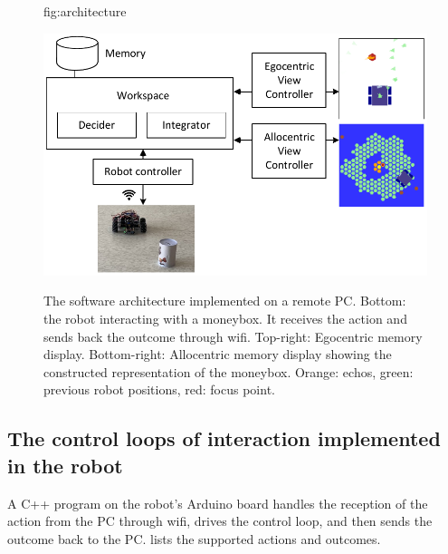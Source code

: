 \documentclass[pmlr]{jmlr}%
\begin{document}
\begin{figure}[htbp]
	\floatconts
	{fig:architecture}
	{\caption{The software architecture implemented on a remote PC. 
			Bottom: the robot interacting with a moneybox. 
			It receives the action and sends back the outcome through wifi.
			Top-right: Egocentric memory display.
			Bottom-right: Allocentric memory display showing the constructed representation of the moneybox.
			Orange: echos, green: previous robot positions, red: focus point.}}
	{\includegraphics[width=0.8\linewidth]{images/Figure_2_Architecture}}
\end{figure}


\subsection{The control loops of interaction implemented in the robot}
\label{moves}

A C++ program on the robot's Arduino board handles the reception of the action from the PC through wifi, drives the control loop, and then sends the outcome back to the PC. 
 lists the supported actions and outcomes.
\end{document}
